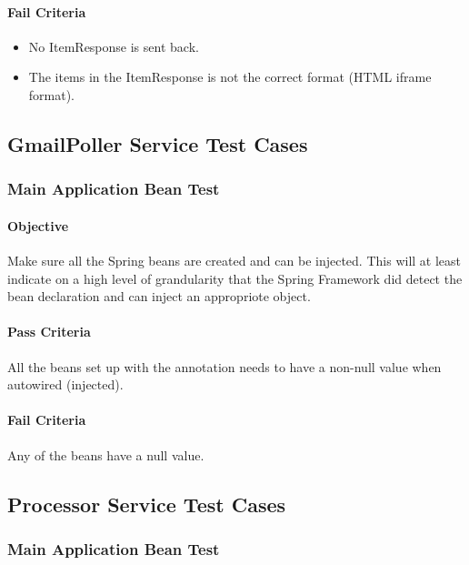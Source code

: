 \documentclass[hidelinks,english]{article}
\begin{document}
				\paragraph{Fail Criteria}
				\begin{itemize}
					\item No ItemResponse is sent back.
					\item The items in the ItemResponse is not the correct format (HTML iframe format).
				\end{itemize}
				
		\subsection{GmailPoller Service Test Cases}
			\subsubsection{Main Application Bean Test}\label{gmailapplicationbeanstest}
				\paragraph{Objective} Make sure all the Spring beans are created and can be injected. This will at least indicate on a high level of grandularity that the Spring Framework did detect the bean declaration and can inject an appropriote object.
				\paragraph{Pass Criteria} All the beans set up with the \emph{\@Bean} annotation needs to have a non-null value when autowired (injected).
				\paragraph{Fail Criteria} Any of the beans have a null value.
				
		\subsection{Processor Service Test Cases}
			\subsubsection{Main Application Bean Test}\label{processorapplicationbeanstest}
\end{document}
